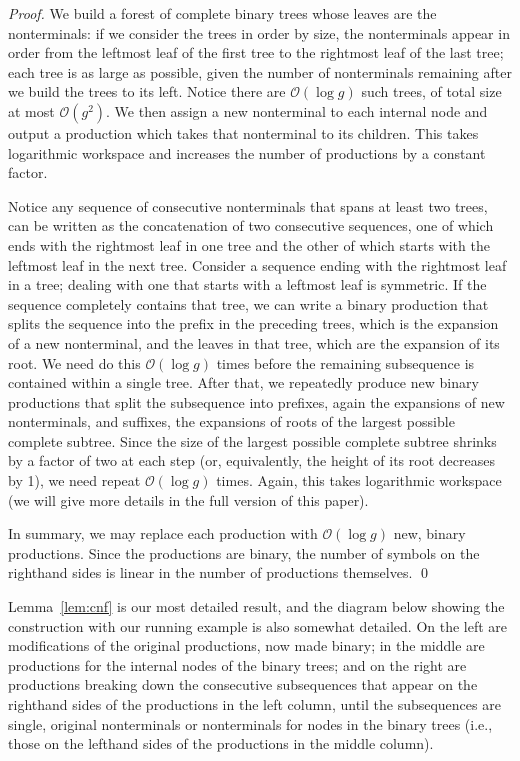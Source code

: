 \documentclass[runningheads]{llncs}
\newcommand{\Oh}[1]
    {\ensuremath{\mathcal{O}\!\left( {#1} \right)}}
\begin{document}
\begin{proof}
We build a forest of complete binary trees whose leaves are the nonterminals: if we consider the trees in order by size, the nonterminals appear in order from the leftmost leaf of the first tree to the rightmost leaf of the last tree; each tree is as large as possible, given the number of nonterminals remaining after we build the trees to its left.  Notice there are $\Oh{\log g}$ such trees, of total size at most $\Oh{g^2}$.  We then assign a new nonterminal to each internal node and output a production which takes that nonterminal to its children.  This takes logarithmic workspace and increases the number of productions by a constant factor.

Notice any sequence of consecutive nonterminals that spans at least two trees, can be written as the concatenation of two consecutive sequences, one of which ends with the rightmost leaf in one tree and the other of which starts with the leftmost leaf in the next tree.  Consider a sequence ending with the rightmost leaf in a tree; dealing with one that starts with a leftmost leaf is symmetric.  If the sequence completely contains that tree, we can write a binary production that splits the sequence into the prefix in the preceding trees, which is the expansion of a new nonterminal, and the leaves in that tree, which are the expansion of its root.  We need do this $\Oh{\log g}$ times before the remaining subsequence is contained within a single tree.  After that, we repeatedly produce new binary productions that split the subsequence into prefixes, again the expansions of new nonterminals, and suffixes, the expansions of roots of the largest possible complete subtree.  Since the size of the largest possible complete subtree shrinks by a factor of two at each step (or, equivalently, the height of its root decreases by 1), we need repeat $\Oh{\log g}$ times.  Again, this takes logarithmic workspace (we will give more details in the full version of this paper).

In summary, we may replace each production with $\Oh{\log g}$ new, binary productions.  Since the productions are binary, the number of symbols on the righthand sides is linear in the number of productions themselves. \qed
\end{proof}

Lemma~\ref{lem:cnf} is our most detailed result, and the diagram below showing the construction with our running example is also somewhat detailed.  On the left are modifications of the original productions, now made binary; in the middle are productions for the internal nodes of the binary trees; and on the right are productions breaking down the consecutive subsequences that appear on the righthand sides of the productions in the left column, until the subsequences are single, original nonterminals or nonterminals for nodes in the binary trees (i.e., those on the lefthand sides of the productions in the middle column).
\end{document}
